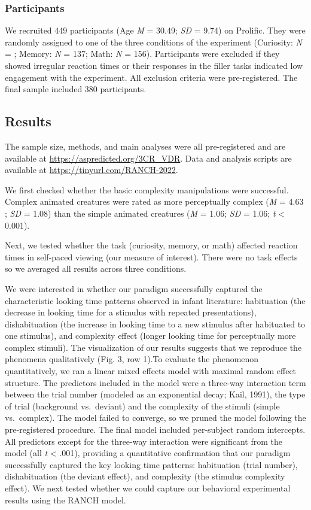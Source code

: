 \documentclass[10pt, letterpaper]{article}
\begin{document}
\hypertarget{participants}{%
\subsubsection{Participants}\label{participants}}

We recruited 449 participants (Age \emph{M} = 30.49; \emph{SD} = 9.74)
on Prolific. They were randomly assigned to one of the three conditions
of the experiment (Curiosity: \emph{N} = ; Memory: \emph{N} = 137; Math:
\emph{N} = 156). Participants were excluded if they showed irregular
reaction times or their responses in the filler tasks indicated low
engagement with the experiment. All exclusion criteria were
pre-registered. The final sample included 380 participants.

\hypertarget{results}{%
\subsection{Results}\label{results}}

The sample size, methods, and main analyses were all pre-registered and
are available at \url{https://aspredicted.org/3CR_VDR}. Data and
analysis scripts are available at \url{https://tinyurl.com/RANCH-2022}.

We first checked whether the basic complexity manipulations were
successful. Complex animated creatures were rated as more perceptually
complex (\emph{M} = 4.63 ; \emph{SD} = 1.08) than the simple animated
creatures (\emph{M} = 1.06; \emph{SD} = 1.06; \emph{t} \textless{}
0.001).

Next, we tested whether the task (curiosity, memory, or math) affected
reaction times in self-paced viewing (our measure of interest). There
were no task effects so we averaged all results across three conditions.

We were interested in whether our paradigm successfully captured the
characteristic looking time patterns observed in infant literature:
habituation (the decrease in looking time for a stimulus with repeated
presentations), dishabituation (the increase in looking time to a new
stimulus after habituated to one stimulus), and complexity effect
(longer looking time for perceptually more complex stimuli). The
visualization of our results suggests that we reproduce the phenomena
qualitatively (Fig. 3, row 1).To evaluate the phenomenon quantitatively,
we ran a linear mixed effects model with maximal random effect
structure. The predictors included in the model were a three-way
interaction term between the trial number (modeled as an exponential
decay; Kail, 1991), the type of trial (background vs.~deviant) and the
complexity of the stimuli (simple vs.~complex). The model failed to
converge, so we pruned the model following the pre-registered procedure.
The final model included per-subject random intercepts. All predictors
except for the three-way interaction were significant from the model
(all \emph{t} \textless{} .001), providing a quantitative confirmation
that our paradigm successfully captured the key looking time patterns:
habituation (trial number), dishabituation (the deviant effect), and
complexity (the stimulus complexity effect). We next tested whether we
could capture our behavioral experimental results using the RANCH model.
\end{document}
